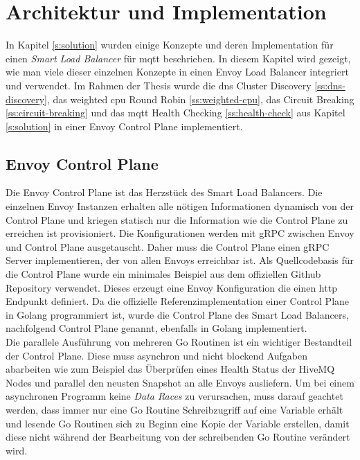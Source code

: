\section{Architektur und Implementation}
In Kapitel \ref{s:solution} wurden einige Konzepte und deren Implementation für einen \textit{Smart Load Balancer} für \ac{mqtt} beschrieben. In diesem Kapitel wird gezeigt, wie man viele dieser einzelnen Konzepte in einen Envoy Load Balancer integriert und verwendet.
Im Rahmen der Thesis wurde die \ac{dns} Cluster Discovery \ref{ss:dns-discovery}, das weighted \ac{cpu} Round Robin \ref{ss:weighted-cpu}, das Circuit Breaking \ref{ss:circuit-breaking} und das \ac{mqtt} Health Checking \ref{ss:health-check} aus Kapitel \ref{s:solution} in einer Envoy Control Plane implementiert.

\subsection{Envoy Control Plane} \label{si:control-plane}
Die Envoy Control Plane ist das Herzstück des Smart Load Balancers. Die einzelnen Envoy Instanzen erhalten alle nötigen Informationen dynamisch von der Control Plane und kriegen statisch nur die Information wie die Control Plane zu erreichen ist provisioniert.
Die Konfigurationen werden mit gRPC zwischen Envoy und Control Plane ausgetauscht. Daher muss die Control Plane einen gRPC Server implementieren, der von allen Envoys erreichbar ist.
Als Quellcodebasis für die Control Plane wurde ein minimales Beispiel aus dem offiziellen Github Repository \cite{EnvoyproxyGocontrolplane} verwendet. Dieses erzeugt eine Envoy Konfiguration die einen \ac{http} Endpunkt definiert. Da die offizielle Referenzimplementation einer Control Plane in Golang programmiert ist, wurde die Control Plane des Smart Load Balancers, nachfolgend Control Plane genannt, ebenfalls in Golang implementiert.
\\
Die parallele Ausführung von mehreren Go Routinen ist ein wichtiger Bestandteil der Control Plane. Diese muss asynchron und nicht blockend Aufgaben abarbeiten wie zum Beispiel das Überprüfen eines Health Status der HiveMQ Nodes und parallel den neusten Snapshot an alle Envoys ausliefern.
Um bei einem asynchronen Programm keine \textit{Data Races} zu verursachen, muss darauf geachtet werden, dass immer nur eine Go Routine Schreibzugriff auf eine Variable erhält und lesende Go Routinen sich zu Beginn eine Kopie der Variable erstellen, damit diese nicht während der Bearbeitung von der schreibenden Go Routine verändert wird.
